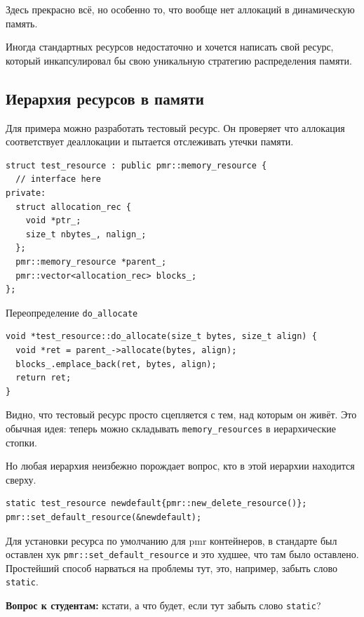 \documentclass[a4paper,12pt,oneside]{book}
\newif\ifanswers
\begin{document}
Здесь прекрасно всё, но особенно то, что вообще нет аллокаций в динамическую память.

Иногда стандартных ресурсов недостаточно и хочется написать свой ресурс, который инкапсулировал бы свою уникальную стратегию распределения памяти.

\subsection{Иерархия ресурсов в памяти}\label{sub:testresrc}

Для примера можно разработать тестовый ресурс. Он проверяет что аллокация соответствует деаллокации и пытается отслеживать утечки памяти.

\begin{lstlisting}
struct test_resource : public pmr::memory_resource {
  // interface here
private:
  struct allocation_rec {
    void *ptr_;
    size_t nbytes_, nalign_;
  };
  pmr::memory_resource *parent_;
  pmr::vector<allocation_rec> blocks_;
};
\end{lstlisting}

Переопределение \lstinline!do_allocate!

\begin{lstlisting}
void *test_resource::do_allocate(size_t bytes, size_t align) {
  void *ret = parent_->allocate(bytes, align);
  blocks_.emplace_back(ret, bytes, align);
  return ret;
}
\end{lstlisting}

Видно, что тестовый ресурс просто сцепляется с тем, над которым он живёт. Это обычная идея: теперь можно складывать \lstinline!memory_resources! в иерархические стопки.

Но любая иерархия неизбежно порождает вопрос, кто в этой иерархии находится сверху.

\begin{lstlisting}
static test_resource newdefault{pmr::new_delete_resource()};
pmr::set_default_resource(&newdefault);
\end{lstlisting}

Для установки ресурса по умолчанию для pmr контейнеров, в стандарте был оставлен хук \lstinline!pmr::set_default_resource! и это худшее, что там было оставлено. Простейший способ нарваться на проблемы тут, это, например, забыть слово \lstinline!static!.

\textbf{Вопрос к студентам:} кстати, а что будет, если тут забыть слово \lstinline!static!?

\ifanswers
Правильный ответ: проблемы при выполнении деструкторов объектов, которые будут закладываться на то, что дефолтный ресурс ещё существует.
\fi
\end{document}
